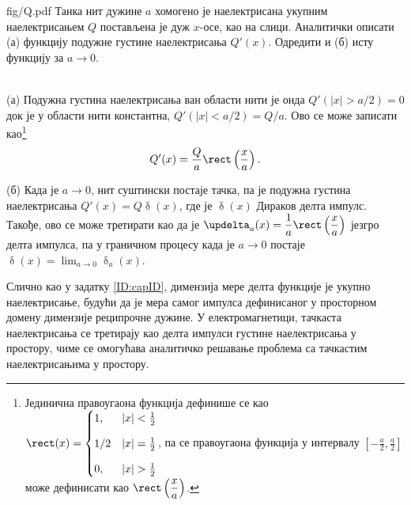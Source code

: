 \noindent
\begin{slikaDesno}[0.833]{fig/Q.pdf}\noindent
\PID 
Танка нит дужине $a$ хомогено је наелектрисана укупним 
наелектрисањем $Q$ постављена је дуж $x$-осе, као на слици. 
Аналитички описати (а) функцију подужне густине 
наелектрисања $Q'(x)$. Одредити и (б) исту функцију за
$a \to 0$. 
\end{slikaDesno} \\[2mm]

\RESENJE 
(а) Подужна густина наелектрисања ван области нити је онда 
    $Q'(|x| > a/2) = 0$ док је у области нити константна, $Q'(|x| < a/2) = Q/a$.
    Ово се може записати као\footnote{ Јединична правоугаона функција дефинише се као \vspace*{1mm}
    $\rect(x) = \begin{cases}
        1, & |x| < \frac12 \\[3mm]
        1/2 & |x| = \frac{1}{2} \\[3mm]
        0, & |x| > \frac12 \end{cases}$, 
        па се правоугаона функција у интервалу $\displaystyle \left[-\frac{a}{2}, \frac{a}{2}\right]$ може дефинисати као
        $\rect\left(\dfrac{x}{a}\right)$.}
    \begin{equation}
        Q'(x) = \dfrac{Q}{a} \rect\left(\dfrac{x}{a}\right).
    \end{equation}
    
(б) Када је $a \to 0$, нит суштински постаје тачка, па је подужна густина наелектрисања
    $Q'(x) = Q \updelta(x)$, где је $\updelta(x)$ Дираков делта импулс. Такође, ово се може третирати као да је 
    $\updelta_a(x) = \dfrac{1}{a} \rect\left(\dfrac{x}{a}\right)$ језгро делта импулса, па у граничном процесу 
    \vspace*{1mm}
    када је $a \to 0$ постаје $\updelta(x) = \lim_{a \to 0} \updelta_a(x)$.

Слично као у задатку \ref{ID:capID}, димензија мере делта функције је укупно наелектрисање, будући да је мера
самог импулса дефинисаног у просторном домену димензије реципрочне дужине. 
У електромагнетици, тачкаста наелектрисања се третирају као делта импулси густине наелектрисања у простору, чиме се 
    омогућава аналитичко решавање проблема са тачкастим наелектрисањима у простору.